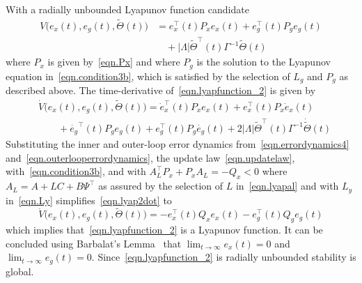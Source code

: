 \documentclass[journal]{IEEEtran}
\theoremstyle{innercustomthm}
\begin{document}
  \begin{proof-dan}
    With a radially unbounded Lyapunov function candidate
    {%
      \small
      \begin{align}
        \label{eqn.lyapfunction_2}
        V\bigr(e_{x}(t), e_{g}(t), \widetilde{\Theta}(t)\bigr) &= e_{x}^{\top}(t)P_{x}e_{x}(t) + e_{g}^{\top}(t)P_{g}e_{g}(t) \nonumber \\
        & \quad + |\Lambda|\widetilde{\Theta}^{\top}(t)\Gamma^{-1}\widetilde{\Theta}(t)
      \end{align}
    }%
    where $P_{x}$ is given by\ \eqref{eqn.Px} and where $P_{g}$ is the solution to the Lyapunov equation in\ \eqref{eqn.condition3b}, which is satisfied by the selection of $L_{g}$ and $P_{g}$ as described above.
    The time-derivative of\ \eqref{eqn.lyapfunction_2} is given by
    {%
      \small
      \begin{equation}
        \label{eqn.lyap2dot}
        \begin{split}
          &\dot{V}\bigr(e_{x}(t), e_{g}(t), \widetilde{\Theta}(t)\bigr)
          =
          \dot{e}_{x}^{\top}(t)P_{x}e_{x}(t)
          + e_{x}^{\top}(t)P_{x}\dot{e}_{x}(t) \\
          & \qquad
          + \dot{e_{g}}^{\top}(t)P_{g}e_{g}(t)
          + e_{g}^{\top}(t)P_{g}\dot{e_{g}}(t)
          + 2|\Lambda|\widetilde{\Theta}^{\top}(t)\Gamma^{-1}\dot{\widetilde{\Theta}}(t)
        \end{split}
      \end{equation}
    }%
    Substituting the inner and outer-loop error dynamics from\ \eqref{eqn.errordynamics4} and\ \eqref{eqn.outerlooperrordynamics}, the update law\ \eqref{eqn.updatelaw}, with\ \eqref{eqn.condition3b}, and with $A_{L}^{\top}P_{x}+P_{x}A_{L}=-Q_{x}<0$ where $A_{L} = A+LC+B\Psi^{\top}$ as assured by the selection of $L$ in\ \eqref{eqn.lyapal} and with $L_{y}$ in\ \eqref{eqn.Ly} simplifies\ \eqref{eqn.lyap2dot} to
    {%
      \small
      \begin{equation}
        \label{eqn.outerlooplyapderivative}
        \dot{V}\bigr(e_{x}(t), e_{g}(t), \widetilde{\Theta}(t)\bigr)
        =
        - e_{x}^{\top}(t)Q_{x}e_{x}(t)
        - e_{g}^{\top}(t)Q_{g}e_{g}(t)
      \end{equation}
    }%
    which implies that\ \eqref{eqn.lyapfunction_2} is a Lyapunov function.
    It can be concluded using Barbalat's Lemma\ \cite{narendra.stable.2005} that $\lim_{t\rightarrow\infty}e_{x}(t)=0$ and $\lim_{t\rightarrow\infty}e_{g}(t)=0$.
    Since\ \eqref{eqn.lyapfunction_2} is radially unbounded stability is global.
  \end{proof-dan}
\end{document}
